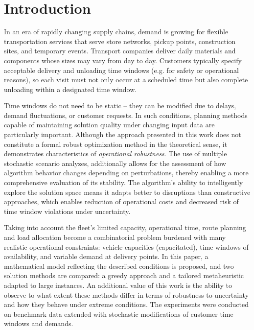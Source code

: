 



%
%
%
%


\section{Introduction}\label{sec:introduction}
In an era of rapidly changing supply chains, demand is growing for flexible transportation services that serve store networks, pickup points, construction sites, and temporary events. Transport companies deliver daily materials and components whose sizes may vary from day to day. Customers typically specify acceptable delivery and unloading time windows (e.g. for safety or operational reasons), so each visit must not only occur at a scheduled time but also complete unloading within a designated time window.

Time windows do not need to be static -- they can be modified due to delays, demand fluctuations, or customer requests. In such conditions, planning methods capable of maintaining solution quality under changing input data are particularly important. Although the approach presented in this work does not constitute a formal robust optimization method in the theoretical sense, it demonstrates characteristics of \emph{operational robustness}. The use of multiple stochastic scenario analyzes, additionally allows for the assessment of how algorithm behavior changes depending on perturbations, thereby enabling a more comprehensive evaluation of its stability. The algorithm's ability to intelligently explore the solution space means it adapts better to disruptions than constructive approaches, which enables reduction of operational costs and decreased risk of time window violations under uncertainty.

Taking into account the fleet's limited capacity, operational time, route planning and load allocation become a combinatorial problem burdened with many realistic operational constraints: vehicle capacities (capacitated), time windows of availability, and variable demand at delivery points. In this paper, a mathematical model reflecting the described conditions is proposed, and two solution methods are compared: a greedy approach and a tailored metaheuristic adapted to large instances. An additional value of this work is the ability to observe to what extent these methods differ in terms of robustness to uncertainty and how they behave under extreme conditions. The experiments were conducted on benchmark data extended with stochastic modifications of customer time windows and demands.


